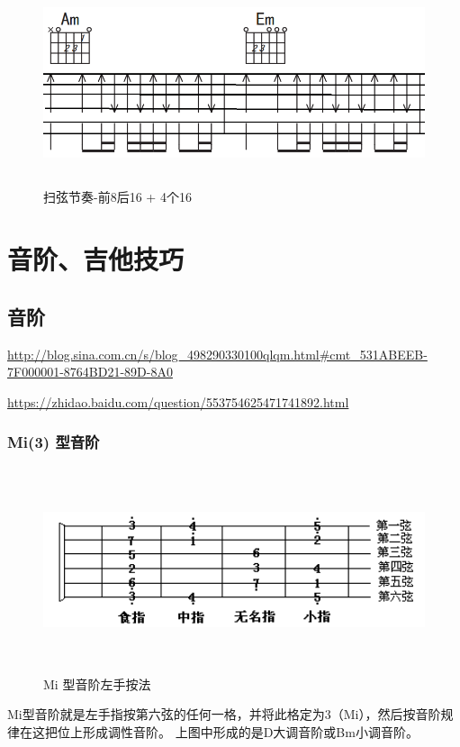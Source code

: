 \documentclass[UTF8,a4paper,12pt]{ctexbook}
\begin{document}
		\begin{figure}[H]
			\centering
			\includegraphics[width=15cm,height=6cm]{sao_04}
			\caption{扫弦节奏-前8后16 + 4个16}
		\end{figure}

\chapter{音阶、吉他技巧}
	\section{音阶}
		\url{http://blog.sina.com.cn/s/blog_498290330100qlqm.html#cmt_531ABEEB-7F000001-8764BD21-89D-8A0}
		
		\url{https://zhidao.baidu.com/question/553754625471741892.html}
		
		\subsection{Mi(3) 型音阶}
			\begin{figure}[H]
				\centering
				\includegraphics[width=15cm,height=6cm]{mi}
				\caption{Mi 型音阶左手按法}
			\end{figure}	
			
			Mi型音阶就是左手指按第六弦的任何一格，并将此格定为3（Mi），然后按音阶规律在这把位上形成调性音阶。
			上图中形成的是D大调音阶或Bm小调音阶。
			
\end{document}
